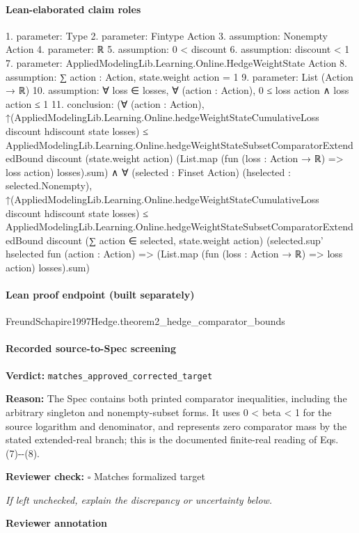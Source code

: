 \documentclass[10pt]{article}
\newcommand{\reviewerbox}{%
  \par\noindent\fbox{\parbox{0.96\linewidth}{\rule{0pt}{0.38in}}}\par
}
\newcommand{\reviewmatch}[1]{%
  \par\noindent\textbf{Reviewer check:} $\square$\; #1\par
  \noindent\emph{If left unchecked, explain the discrepancy or uncertainty below.}\par
}
\begin{document}
\paragraph{Lean-elaborated claim roles}\begin{ReviewVerbatim}
1. parameter: Type
2. parameter: Fintype Action
3. assumption: Nonempty Action
4. parameter: ℝ
5. assumption: 0 < discount
6. assumption: discount < 1
7. parameter: AppliedModelingLib.Learning.Online.HedgeWeightState Action
8. assumption: ∑ action : Action, state.weight action = 1
9. parameter: List (Action → ℝ)
10. assumption: ∀ loss ∈ losses, ∀ (action : Action), 0 ≤ loss action ∧ loss action ≤ 1
11. conclusion: (∀ (action : Action),
    ↑(AppliedModelingLib.Learning.Online.hedgeWeightStateCumulativeLoss discount hdiscount state losses) ≤
      AppliedModelingLib.Learning.Online.hedgeWeightStateSubsetComparatorExtendedBound discount (state.weight action)
        (List.map (fun (loss : Action → ℝ) => loss action) losses).sum) ∧
  ∀ (selected : Finset Action) (hselected : selected.Nonempty),
    ↑(AppliedModelingLib.Learning.Online.hedgeWeightStateCumulativeLoss discount hdiscount state losses) ≤
      AppliedModelingLib.Learning.Online.hedgeWeightStateSubsetComparatorExtendedBound discount
        (∑ action ∈ selected, state.weight action)
        (selected.sup' hselected fun (action : Action) =>
          (List.map (fun (loss : Action → ℝ) => loss action) losses).sum)
\end{ReviewVerbatim}

\paragraph{Lean proof endpoint (built separately)}\begin{ReviewVerbatim}
FreundSchapire1997Hedge.theorem2_hedge_comparator_bounds
\end{ReviewVerbatim}

\paragraph{Recorded source-to-Spec screening}
\textbf{Verdict:} \texttt{matches\_approved\_corrected\_target}
\\
{\raggedright
\textbf{Reason:} The Spec contains both printed comparator inequalities, including the arbitrary singleton and nonempty-\allowbreak{}subset forms.\allowbreak{} It uses 0 < beta < 1 for the source logarithm and denominator, and represents zero comparator mass by the stated extended-\allowbreak{}real branch;\allowbreak{} this is the documented finite-\allowbreak{}real reading of Eqs.\allowbreak{} (7)-\allowbreak{}-\allowbreak{}(8).\allowbreak{}
\par}
\reviewmatch{Matches formalized target}
\noindent\textbf{Reviewer annotation}\par
\reviewerbox
\clearpage
\hypertarget{source-claim-9d8bdc89a086e8c4}{}
\end{document}
